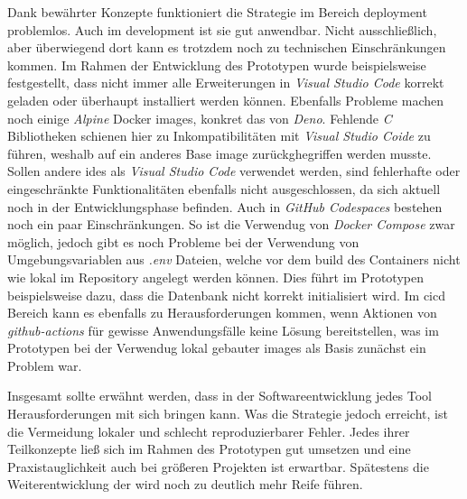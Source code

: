 Dank bewährter Konzepte funktioniert die Strategie im Bereich \Gls{deployment} problemlos. Auch im \Gls{development} ist sie gut anwendbar. Nicht ausschließlich, aber überwiegend dort kann es trotzdem noch zu technischen Einschränkungen kommen. Im Rahmen der Entwicklung des Prototypen wurde beispielsweise festgestellt, dass nicht immer alle Erweiterungen in \textit{Visual Studio Code} korrekt geladen oder überhaupt installiert werden können. Ebenfalls Probleme machen noch einige \textit{Alpine} Docker \Glspl{image}, konkret das von \textit{Deno}. Fehlende \textit{C} Bibliotheken schienen hier zu Inkompatibilitäten mit \textit{Visual Studio Coide} zu führen, weshalb auf ein anderes Base \Gls{image} zurückghegriffen werden musste. Sollen andere \Glspl{ide} als \textit{Visual Studio Code} verwendet werden, sind fehlerhafte oder eingeschränkte Funktionalitäten ebenfalls nicht ausgeschlossen, da sich  aktuell noch in der Entwicklungsphase befinden. Auch in \textit{GitHub Codespaces} bestehen noch ein paar Einschränkungen. So ist die Verwendug von \textit{Docker Compose} zwar möglich, jedoch gibt es noch Probleme bei der Verwendung von Umgebungsvariablen aus \textit{.env} Dateien, welche vor dem \Gls{build} des Containers nicht wie lokal im Repository angelegt werden können. Dies führt im Prototypen beispielsweise dazu, dass die Datenbank nicht korrekt initialisiert wird. Im \Gls{cicd} Bereich kann es ebenfalls zu Herausforderungen kommen, wenn Aktionen von \textit{\Gls{github-actions}} für gewisse Anwendungsfälle keine Lösung bereitstellen, was im Prototypen bei der Verwendug lokal gebauter \Glspl{image} als Basis zunächst ein Problem war.

Insgesamt sollte erwähnt werden, dass in der Softwareentwicklung jedes Tool Herausforderungen mit sich bringen kann. Was die  Strategie jedoch erreicht, ist die Vermeidung lokaler und schlecht reproduzierbarer Fehler. Jedes ihrer Teilkonzepte ließ sich im Rahmen des Prototypen gut umsetzen und eine Praxistauglichkeit auch bei größeren Projekten ist erwartbar. Spätestens die Weiterentwicklung der  wird noch zu deutlich mehr Reife führen.
